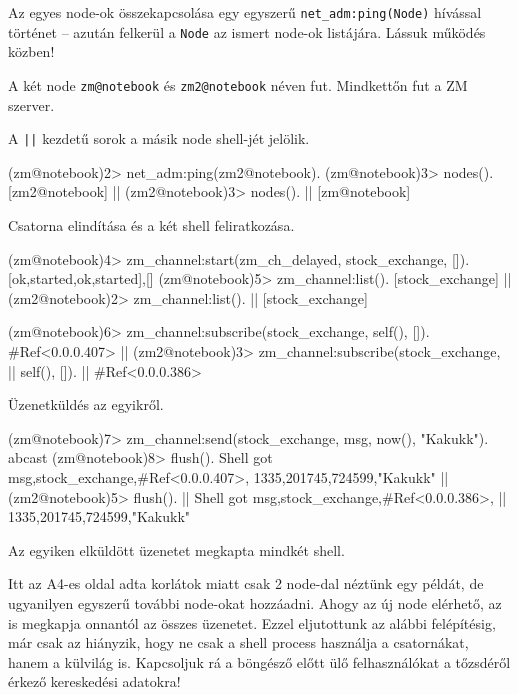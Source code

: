 \documentclass[12pt, a4paper, oneside]{book}
\begin{document}
Az egyes node-ok összekapcsolása egy egyszerű \texttt{net\_adm:ping(Node)}
hívással történet -- azután felkerül a \texttt{Node} az ismert node-ok
listájára. Lássuk működés közben! 

A két node \texttt{zm@notebook} és \texttt{zm2@notebook} néven fut. Mindkettőn
fut a ZM szerver.

A \texttt{||} kezdetű sorok a másik node shell-jét jelölik.

\begin{code}{}{}
(zm@notebook)2> net_adm:ping(zm2@notebook).
(zm@notebook)3> nodes().
[zm2@notebook]
  || (zm2@notebook)3> nodes().
  || [zm@notebook]
\end{code}

Csatorna elindítása és a két shell feliratkozása.

\begin{code}{}{}
(zm@notebook)4> zm_channel:start(zm_ch_delayed, 
                                 stock_exchange, []).
{[{ok,started},{ok,started}],[]}
(zm@notebook)5> zm_channel:list().
[stock_exchange]
  || (zm2@notebook)2> zm_channel:list().
  || [stock_exchange]

(zm@notebook)6> zm_channel:subscribe(stock_exchange, self(), []).   
#Ref<0.0.0.407>
  || (zm2@notebook)3> zm_channel:subscribe(stock_exchange, 
  ||                                       self(), []).
  || #Ref<0.0.0.386>
\end{code}

Üzenetküldés az egyikről.

\begin{code}{}{}
(zm@notebook)7> zm_channel:send(stock_exchange, 
                                {msg, {now(), "Kakukk"}}).
abcast
(zm@notebook)8> flush().
Shell got {msg,{stock_exchange,#Ref<0.0.0.407>},
               {{1335,201745,724599},"Kakukk"}}
  || (zm2@notebook)5> flush().
  || Shell got {msg,{stock_exchange,#Ref<0.0.0.386>},
  ||                {{1335,201745,724599},"Kakukk"}}
\end{code}

Az egyiken elküldött üzenetet megkapta mindkét shell.

Itt az A4-es oldal adta korlátok miatt csak 2 node-dal néztünk egy példát, de
ugyanilyen egyszerű további node-okat hozzáadni. Ahogy az új node elérhető, az
is megkapja onnantól az összes üzenetet. Ezzel eljutottunk az alábbi
felépítésig, már csak az hiányzik, hogy ne csak a shell process használja a
csatornákat, hanem a külvilág is. Kapcsoljuk rá a böngésző előtt ülő
felhasználókat a tőzsdéről érkező kereskedési adatokra!
\end{document}
